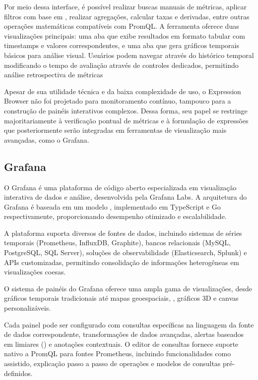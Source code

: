 Por meio dessa interface, é possível realizar buscas manuais de métricas, aplicar filtros com base em , realizar agregações, calcular taxas e derivadas, entre outras operações matemáticas compatíveis com PromQL. A ferramenta oferece duas visualizações principais: uma aba  que exibe resultados em formato tabular com timestamps e valores correspondentes, e uma aba  que gera gráficos temporais básicos para análise visual. Usuários podem navegar através do histórico temporal modificando o tempo de avaliação através de controles dedicados, permitindo análise retrospectiva de métricas

Apesar de sua utilidade técnica e da baixa complexidade de uso, o Expression Browser não foi projetado para monitoramento contínuo, tampouco para a construção de painéis interativos complexos. Dessa forma, seu papel se restringe majoritariamente à verificação pontual de métricas e à formulação de expressões que posteriormente serão integradas em ferramentas de visualização mais avançadas, como o Grafana.

\subsection{Grafana}
\label{subsection:Grafana}

O Grafana \citep{grafana2025} é uma plataforma de código aberto especializada em visualização interativa de dados e análise, desenvolvida pela Grafana Labs. A arquitetura do Grafana é baseada em um modelo , implementado em TypeScript e Go respectivamente, proporcionando desempenho otimizado e escalabilidade.

A plataforma suporta diversos  de fontes de dados, incluindo sistemas de séries temporais (Prometheus, InfluxDB, Graphite), bancos relacionais (MySQL, PostgreSQL, SQL Server), soluções de observabilidade (Elasticsearch, Splunk) e APIs customizadas, permitindo consolidação de informações heterogêneas em visualizações coesas.

O sistema de painéis do Grafana oferece uma ampla gama de visualizações, desde gráficos temporais tradicionais até mapas geoespaciais, , gráficos 3D e canvas personalizáveis.

Cada painel pode ser configurado com consultas específicas na linguagem da fonte de dados correspondente, transformações de dados avançadas, alertas baseados em limiares () e anotações contextuais. O editor de consultas fornece suporte nativo a PromQL para fontes Prometheus, incluindo funcionalidades como  assistido, explicação passo a passo de operações e modelos de consultas pré-definidos.

